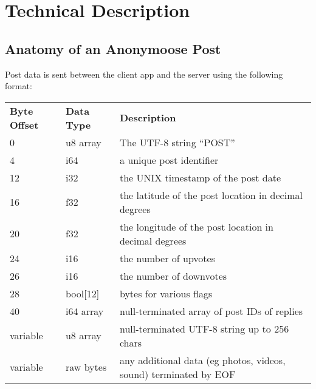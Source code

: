 \documentclass[12pt, a4paper]{article}
\begin{document}
\clearpage
\section{Technical Description}
\subsection{Anatomy of an Anonymoose Post}
Post data is sent between the client app and the server using the following format:
\begin{table}[h]
\centering
\label{my-label}
\begin{tabular}{lll}
\textbf{Byte Offset} & \textbf{Data Type} &\textbf{Description}\\
0 & u8 array & The UTF-8 string ``POST''\\
4 & i64 & a unique post identifier\\
12 & i32 & the UNIX timestamp of the post date\\
16 & f32 & the latitude of the post location in decimal degrees\\
20 & f32 & the longitude of the post location in decimal degrees\\
24 & i16 & the number of upvotes\\
26 & i16 & the number of downvotes\\
28 & bool[12] & bytes for various flags\\
40 & i64 array & null-terminated array of post IDs of replies\\
variable & u8 array & null-terminated UTF-8 string up to 256 chars\\
variable & raw bytes & any additional data (eg photos, videos, sound) terminated by EOF\\

\end{tabular}
\end{table}
\end{document}
